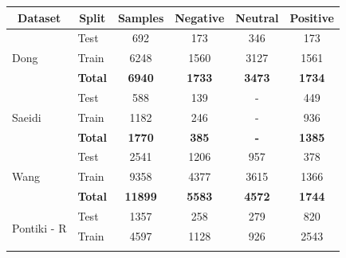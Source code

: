 \documentclass[12pt, a4paper]{report}
\theoremstyle{definition}
\theoremstyle{definition}%
\theoremstyle{definition}%
\theoremstyle{definition}%
\theoremstyle{definition}%
\theoremstyle{definition}%
\begin{document}
\begin{table}
	\centering
	\begin{tabular}{|l|l|c|ccc|}
		\hline
		\multicolumn{1}{|c|}{\textbf{Dataset}} & \multicolumn{1}{c|}{\textbf{Split}} & \textbf{Samples} & \textbf{Negative} & \textbf{Neutral} & \textbf{Positive} \\ \hline\hline
		\multirow{3}{*}{Dong}                  & Test                                & 692              & 173               & 346              & 173               \\
		                                       & Train                               & 6248             & 1560              & 3127             & 1561              \\ \cline{2-6}
		                                       & \textbf{Total}                      & \textbf{6940}    & \textbf{1733}     & \textbf{3473}    & \textbf{1734}     \\ \hline\hline
		\multirow{3}{*}{Saeidi}                & Test                                & 588              & 139               & -                & 449               \\
		                                       & Train                               & 1182             & 246               & -                & 936               \\ \cline{2-6}
		                                       & \textbf{Total}                      & \textbf{1770}    & \textbf{385}      & \textbf{-}       & \textbf{1385}     \\ \hline\hline
		\multirow{3}{*}{Wang}                  & Test                                & 2541             & 1206              & 957              & 378               \\
		                                       & Train                               & 9358             & 4377              & 3615             & 1366              \\ \cline{2-6}
		                                       & \textbf{Total}                      & \textbf{11899}   & \textbf{5583}     & \textbf{4572}    & \textbf{1744}     \\ \hline\hline
		\multirow{3}{*}{Pontiki - R}           & Test                                & 1357             & 258               & 279              & 820               \\
		                                       & Train                               & 4597             & 1128              & 926              & 2543              \\ \cline{2-6}

\end{tabular}
\end{table}
\end{document}
